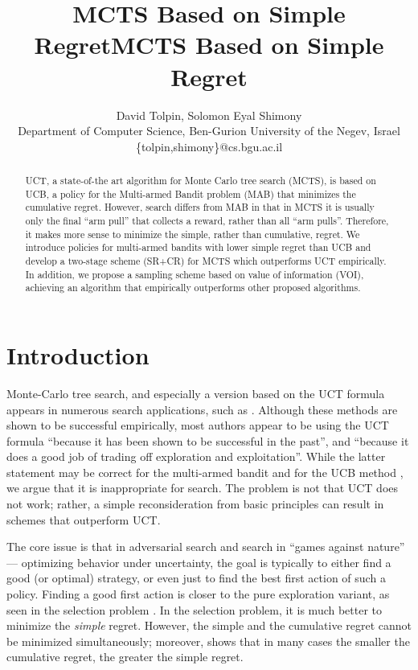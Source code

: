 \documentclass[letterpaper]{article}
\title{MCTS Based on Simple Regret}
\author {David Tolpin, Solomon Eyal Shimony \\
Department of Computer Science, Ben-Gurion University of the Negev, Israel \\
\{tolpin,shimony\}@cs.bgu.ac.il}
\title{MCTS Based on Simple Regret}
\begin{document}
\maketitle

\begin{abstract}
UCT, a state-of-the art algorithm for Monte Carlo tree search (MCTS),
is based on UCB, a policy for the Multi-armed Bandit problem (MAB) that 
minimizes the cumulative regret.  However, search differs from MAB in
that in MCTS it is usually only the final ``arm pull''
that collects a reward, rather than all ``arm pulls''.
Therefore, it makes more sense to minimize the simple, rather than
cumulative, regret. We  introduce policies for
multi-armed bandits with lower simple
regret than UCB and develop a two-stage scheme (SR+CR) for MCTS
which outperforms UCT empirically. In addition, we propose a sampling
scheme based on value of information (VOI), achieving an algorithm
that empirically outperforms other proposed algorithms.
\end{abstract}

\section{Introduction}

Monte-Carlo tree search, and especially a version based on the
UCT formula \cite{Kocsis.uct} appears in numerous search applications,
such as \cite{GellyWang.mogo,Eyerich.ctp}. Although these methods are shown to be successful empirically,
most authors appear to be using the UCT formula ``because it has been shown
to be successful in the past'', and ``because it does a good job of
trading off exploration and exploitation''. While the latter statement may be
correct for the multi-armed bandit and for the UCB method \cite{Auer.ucb},
we argue that it is inappropriate for search. The problem is not that
UCT does not work; rather, a simple reconsideration from basic
principles can result in schemes that outperform UCT.

The core issue is that in adversarial search
and search in ``games against nature'' --- optimizing behavior under
uncertainty, the goal is typically to either find a good (or optimal)
strategy, or even just to find the best first action of such a
policy. Finding a good first action is closer to the pure
exploration variant, as seen in the selection problem
\cite{Bubeck.pure,TolpinShimony.blinkered}. In the selection problem,
it is much better to minimize the \emph{simple} regret.  However, the
simple and the cumulative regret cannot be minimized simultaneously;
moreover, \cite{Bubeck.pure} shows that in many cases the smaller the
cumulative regret, the greater the simple regret.
\end{document}
